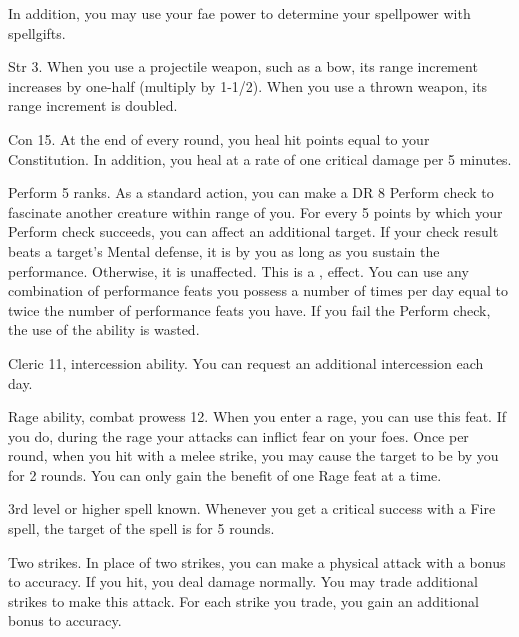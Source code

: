 In addition, you may use your fae power to determine your spellpower with spellgifts.

\featpre Str 3.
\featben When you use a projectile weapon, such as a bow, its range increment increases by one-half (multiply by 1-1/2).
When you use a thrown weapon, its range increment is doubled.

\featpre Con 15.
\featben At the end of every round, you heal hit points equal to your Constitution.
In addition, you heal  at a rate of one critical damage per 5 minutes.

\featpre Perform 5 ranks.
\featben As a standard action, you can make a DR 8 Perform check to fascinate another creature within \rngmed range of you.
For every 5 points by which your Perform check succeeds, you can affect an additional target.
If your check result beats a target's Mental defense, it is \fascinated by you as long as you sustain the performance.
Otherwise, it is unaffected.
This is a ,  effect.
You can use any combination of performance feats you possess a number of times per day equal to twice the number of performance feats you have.
If you fail the Perform check, the use of the ability is wasted.

\featpres Cleric 11, intercession ability.
\featben You can request an additional intercession each day.

\featpres Rage ability, combat prowess 12.
\featben When you enter a rage, you can use this feat. If you do, during the rage your attacks can inflict fear on your foes.
Once per round, when you hit with a melee strike, you may cause the target to be \shaken by you for 2 rounds.
 You can only gain the benefit of one Rage feat at a time.

\featpre 3rd level or higher  spell known.
\featben Whenever you get a critical success with a Fire spell, the target of the spell is \ignited for 5 rounds.

\featpre Two strikes.
\featben In place of two strikes, you can make a physical attack with a  bonus to accuracy.
If you hit, you deal damage normally.
You may trade additional strikes to make this attack.
For each strike you trade, you gain an additional  bonus to accuracy.

